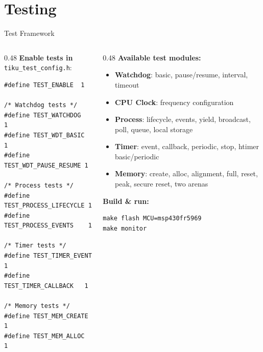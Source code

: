 \documentclass[aspectratio=169, 10pt]{beamer}
\begin{document}
\section{Testing}

\begin{frame}[fragile]{Test Framework}
\begin{columns}[T]
\begin{column}{0.48\textwidth}
\textbf{Enable tests in} \texttt{tiku\_test\_config.h}:
\begin{lstlisting}[style=cstyle]
#define TEST_ENABLE  1

/* Watchdog tests */
#define TEST_WATCHDOG         1
#define TEST_WDT_BASIC        1
#define TEST_WDT_PAUSE_RESUME 1

/* Process tests */
#define TEST_PROCESS_LIFECYCLE 1
#define TEST_PROCESS_EVENTS    1

/* Timer tests */
#define TEST_TIMER_EVENT      1
#define TEST_TIMER_CALLBACK   1

/* Memory tests */
#define TEST_MEM_CREATE       1
#define TEST_MEM_ALLOC        1
\end{lstlisting}
\end{column}
\begin{column}{0.48\textwidth}
\textbf{Available test modules:}
\begin{itemize}
  \item \textbf{Watchdog}: basic, pause/resume, interval, timeout
  \item \textbf{CPU Clock}: frequency configuration
  \item \textbf{Process}: lifecycle, events, yield, broadcast, poll, queue, local storage
  \item \textbf{Timer}: event, callback, periodic, stop, htimer basic/periodic
  \item \textbf{Memory}: create, alloc, alignment, full, reset, peak, secure reset, two arenas
\end{itemize}

\vspace{0.5em}
\textbf{Build \& run:}
\begin{lstlisting}[style=bashstyle]
make flash MCU=msp430fr5969
make monitor
\end{lstlisting}
\end{column}
\end{columns}
\end{frame}
\end{document}
